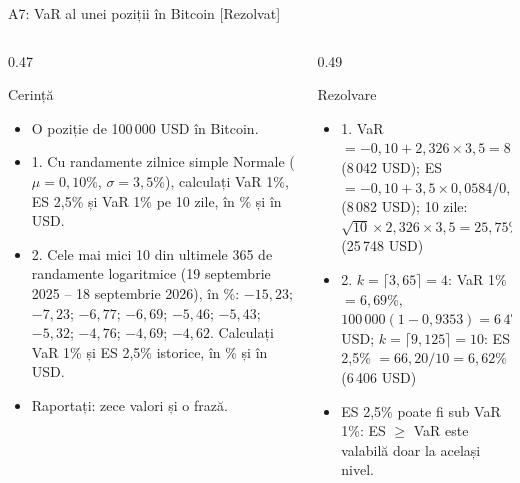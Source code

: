 \begin{frame}{A7: VaR al unei poziții în Bitcoin [Rezolvat]}
\itemsize{\scriptsize}
\begin{columns}[T]
\begin{column}{0.47\textwidth}
\begin{block}{Cerință}
\begin{itemize}
    \item O poziție de 100\,000 USD în Bitcoin.
    \item 1. Cu randamente zilnice simple Normale ($\mu = 0{,}10\%$, $\sigma = 3{,}5\%$), calculați VaR 1\%, ES 2,5\% și VaR 1\% pe 10 zile, în \% și în USD.
    \item 2. Cele mai mici 10 din ultimele 365 de randamente logaritmice (19 septembrie 2025 -- 18 septembrie 2026), în \%: $-15{,}23$; $-7{,}23$; $-6{,}77$; $-6{,}69$; $-5{,}46$; $-5{,}43$; $-5{,}32$; $-4{,}76$; $-4{,}69$; $-4{,}62$. Calculați VaR 1\% și ES 2,5\% istorice, în \% și în USD.
    \item Raportați: zece valori și o frază.
\end{itemize}
\end{block}
\end{column}
\begin{column}{0.49\textwidth}
\begin{exampleblock}{Rezolvare}
\begin{itemize}
    \item 1. VaR $= -0{,}10 + 2{,}326 \times 3{,}5 = 8{,}04\%$ (8\,042 USD); ES $= -0{,}10 + 3{,}5 \times 0{,}0584/0{,}025 = 8{,}08\%$ (8\,082 USD); 10 zile: $\sqrt{10} \times 2{,}326 \times 3{,}5 = 25{,}75\%$ (25\,748 USD)
    \item 2. $k = \lceil 3{,}65 \rceil = 4$: VaR 1\% $= 6{,}69\%$, $100\,000(1 - 0{,}9353) = 6\,471$ USD; $k = \lceil 9{,}125 \rceil = 10$: ES 2,5\% $= 66{,}20/10 = 6{,}62\%$ (6\,406 USD)
    \item ES 2,5\% poate fi sub VaR 1\%: ES $\ge$ VaR este valabilă doar la același nivel.
\end{itemize}
\end{exampleblock}
\end{column}
\end{columns}
\end{frame}

